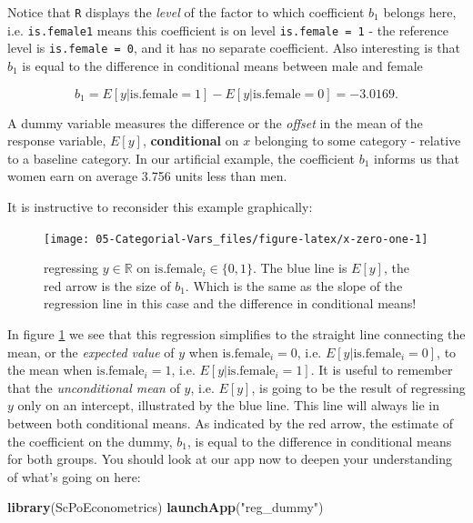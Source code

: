\documentclass[]{book}
\newenvironment{Shaded}{\begin{snugshade}}{\end{snugshade}}
\newcommand{\KeywordTok}[1]{\textcolor[rgb]{0.13,0.29,0.53}{\textbf{#1}}}
\newcommand{\StringTok}[1]{\textcolor[rgb]{0.31,0.60,0.02}{#1}}
\newcommand{\NormalTok}[1]{#1}
\newenvironment{note}{\begin{tcolorbox}[colback=blue!5!white,colframe=blue!75!black]}{\end{tcolorbox}}
\begin{document}
Notice that \texttt{R} displays the \emph{level} of the factor to which
coefficient \(b_1\) belongs here, i.e. \texttt{is.female1} means this
coefficient is on level \texttt{is.female\ =\ 1} - the reference level
is \texttt{is.female\ =\ 0}, and it has no separate coefficient. Also
interesting is that \(b_1\) is equal to the difference in conditional
means between male and female

\[b_1 = E[y|\text{is.female}=1] - E[y|\text{is.female}=0]=-3.0169.\]

\begin{note}
A dummy variable measures the difference or the \emph{offset} in the
mean of the response variable, \(E[y]\), \textbf{conditional} on \(x\)
belonging to some category - relative to a baseline category. In our
artificial example, the coefficient \(b_1\) informs us that women earn
on average 3.756 units less than men.
\end{note}

It is instructive to reconsider this example graphically:

\begin{figure}

{\centering \texttt{[image: 05-Categorial-Vars\_files/figure-latex/x-zero-one-1]} 

}

\caption{regressing $y \in \mathbb{R}$ on $\text{is.female}_i \in \{0,1\}$. The blue line is $E[y]$, the red arrow is the size of $b_1$. Which is the same as the slope of the regression line in this case and the difference in conditional means!}\label{fig:x-zero-one}
\end{figure}

In figure \ref{fig:x-zero-one} we see that this regression simplifies to
the straight line connecting the mean, or the \emph{expected value} of
\(y\) when \(\text{is.female}_i = 0\), i.e.
\(E[y|\text{is.female}_i=0]\), to the mean when
\(\text{is.female}_i=1\), i.e. \(E[y|\text{is.female}_i=1]\). It is
useful to remember that the \emph{unconditional mean} of \(y\), i.e.
\(E[y]\), is going to be the result of regressing \(y\) only on an
intercept, illustrated by the blue line. This line will always lie in
between both conditional means. As indicated by the red arrow, the
estimate of the coefficient on the dummy, \(b_1\), is equal to the
difference in conditional means for both groups. You should look at our
app now to deepen your understanding of what's going on here:

\begin{Shaded}
\begin{Highlighting}[]
\KeywordTok{library}\NormalTok{(ScPoEconometrics)}
\KeywordTok{launchApp}\NormalTok{(}\StringTok{"reg_dummy"}\NormalTok{)}
\end{Highlighting}
\end{Shaded}
\end{document}

